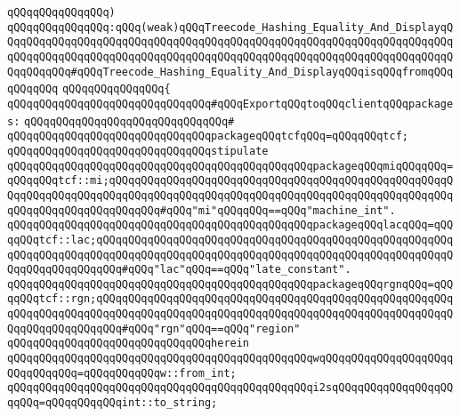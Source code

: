 \newline
\verb|qQQqqQQqqQQqqQQq)|\newline
\verb|qQQqqQQqqQQqqQQq:qQQq(weak)qQQqTreecode_Hashing_Equality_And_DisplayqQQqqQQqqQQqqQQqqQQqqQQqqQQqqQQqqQQqqQQqqQQqqQQqqQQqqQQqqQQqqQQqqQQqqQQqqQQqqQQqqQQqqQQqqQQqqQQqqQQqqQQqqQQqqQQqqQQqqQQqqQQqqQQqqQQqqQQqqQQqqQQqqQQqqQQq#qQQqTreecode_Hashing_Equality_And_DisplayqQQqisqQQqfromqQQqqQQqqQQq|\newline
\verb|qQQqqQQqqQQqqQQq{|\newline
\verb|qQQqqQQqqQQqqQQqqQQqqQQqqQQqqQQq#qQQqExportqQQqtoqQQqclientqQQqpackages:|\newline
\verb|qQQqqQQqqQQqqQQqqQQqqQQqqQQqqQQq#|\newline
\verb|qQQqqQQqqQQqqQQqqQQqqQQqqQQqqQQqpackageqQQqtcfqQQq=qQQqqQQqtcf;|\newline
\newline
\verb|qQQqqQQqqQQqqQQqqQQqqQQqqQQqqQQqstipulate|\newline
\verb|qQQqqQQqqQQqqQQqqQQqqQQqqQQqqQQqqQQqqQQqqQQqqQQqpackageqQQqmiqQQqqQQq=qQQqqQQqtcf::mi;qQQqqQQqqQQqqQQqqQQqqQQqqQQqqQQqqQQqqQQqqQQqqQQqqQQqqQQqqQQqqQQqqQQqqQQqqQQqqQQqqQQqqQQqqQQqqQQqqQQqqQQqqQQqqQQqqQQqqQQqqQQqqQQqqQQqqQQqqQQqqQQqqQQq#qQQq"mi"qQQqqQQq==qQQq"machine_int".|\newline
\verb|qQQqqQQqqQQqqQQqqQQqqQQqqQQqqQQqqQQqqQQqqQQqqQQqpackageqQQqlacqQQq=qQQqqQQqtcf::lac;qQQqqQQqqQQqqQQqqQQqqQQqqQQqqQQqqQQqqQQqqQQqqQQqqQQqqQQqqQQqqQQqqQQqqQQqqQQqqQQqqQQqqQQqqQQqqQQqqQQqqQQqqQQqqQQqqQQqqQQqqQQqqQQqqQQqqQQqqQQqqQQq#qQQq"lac"qQQq==qQQq"late_constant".|\newline
\verb|qQQqqQQqqQQqqQQqqQQqqQQqqQQqqQQqqQQqqQQqqQQqqQQqpackageqQQqrgnqQQq=qQQqqQQqtcf::rgn;qQQqqQQqqQQqqQQqqQQqqQQqqQQqqQQqqQQqqQQqqQQqqQQqqQQqqQQqqQQqqQQqqQQqqQQqqQQqqQQqqQQqqQQqqQQqqQQqqQQqqQQqqQQqqQQqqQQqqQQqqQQqqQQqqQQqqQQqqQQqqQQq#qQQq"rgn"qQQq==qQQq"region"|\newline
\verb|qQQqqQQqqQQqqQQqqQQqqQQqqQQqqQQqherein|\newline
\newline
\verb|qQQqqQQqqQQqqQQqqQQqqQQqqQQqqQQqqQQqqQQqqQQqqQQqwqQQqqQQqqQQqqQQqqQQqqQQqqQQqqQQq=qQQqqQQqqQQqw::from_int;|\newline
\verb|qQQqqQQqqQQqqQQqqQQqqQQqqQQqqQQqqQQqqQQqqQQqqQQqi2sqQQqqQQqqQQqqQQqqQQqqQQq=qQQqqQQqqQQqint::to_string;|\newline
